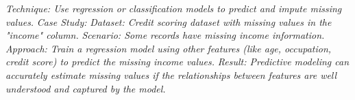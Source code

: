 \documentclass[12pt]{article}
\begin{document}
\hspace{1cm}\large{\emph{Technique: Use regression or classification models to predict and impute missing values.}}\vspace{0.25cm}\newline
\hspace{1cm}\large{\emph{Case Study:}}\vspace{0.25cm}\newline
\hspace{1cm}\large{\emph{Dataset: Credit scoring dataset with missing values in the "income" column.}}\vspace{0.25cm}\newline
\hspace{1cm}\large{\emph{Scenario: Some records have missing income information.}}\vspace{0.25cm}\newline
\hspace{1cm}\large{\emph{Approach: Train a regression model using other features (like age, occupation, credit score) to predict the missing income values.}}\vspace{0.25cm}\newline
\hspace{1cm}\large{\emph{Result: Predictive modeling can accurately estimate missing values if the relationships between features are well understood and captured by the model.}}\vspace{0.25cm}\newline
\end{document}
